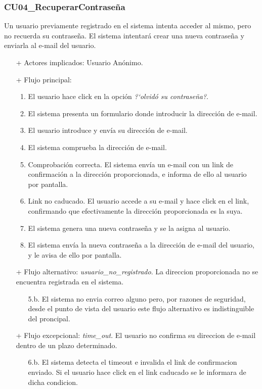 \documentclass[a4paper]{report}
\begin{document}
            \subsubsection{CU04\_RecuperarContrase\~na}
                Un usuario previamente registrado en el sistema intenta acceder al mismo, pero no recuerda su contrase\~na. El sistema intentar\'a crear una nueva contrase\~na y enviarla al e-mail del usuario.
                \begin{itemize}
                    \item[+] Actores implicados: Usuario An\'onimo.
                    \item[+] Flujo principal:
                    \begin{enumerate}
                        \item El usuario hace click en la opci\'on \emph{?`olvid\'o su contrase\~na?}.
                        \item El sistema presenta un formulario donde introducir la direcci\'on de e-mail.
                        \item El usuario introduce y env\'ia su direcci\'on de e-mail.
                        \item El sistema comprueba la direcci\'on de e-mail.
                        \item Comprobaci\'on correcta. El sistema env\'ia un e-mail con un link de confirmaci\'on a la direcci\'on proporcionada, e informa de ello al usuario por pantalla.
                        \item Link no caducado. El usuario accede a su e-mail y hace click en el link, confirmando que efectivamente la direcci\'on proporcionada es la suya.
                        \item El sistema genera una nueva contrase\~na y se la asigna al usuario.
                        \item El sistema env\'ia la nueva contrase\~na a la direcci\'on de e-mail del usuario, y le avisa de ello por pantalla.
                    \end{enumerate}
                    \item[+] Flujo alternativo: \emph{usuario\_no\_registrado}. La direccion proporcionada no se encuentra registrada en el sistema.
                    \begin{itemize}
                        \item[5.b.] El sistema no envia correo alguno pero, por razones de seguridad, desde el punto de vista del usuario este flujo alternativo es indistinguible del proncipal.
                    \end{itemize}
                    \item[+] Flujo excepcional: \emph{time\_out}. El usuario no confirma su direccion de e-mail dentro de un plazo determinado.
                    \begin{itemize}
                        \item[6.b.] El sistema detecta el timeout e invalida el link de confirmacion enviado. Si el usuario hace click en el link caducado se le informara de dicha condicion.
                    \end{itemize}
                \end{itemize}
\end{document}
